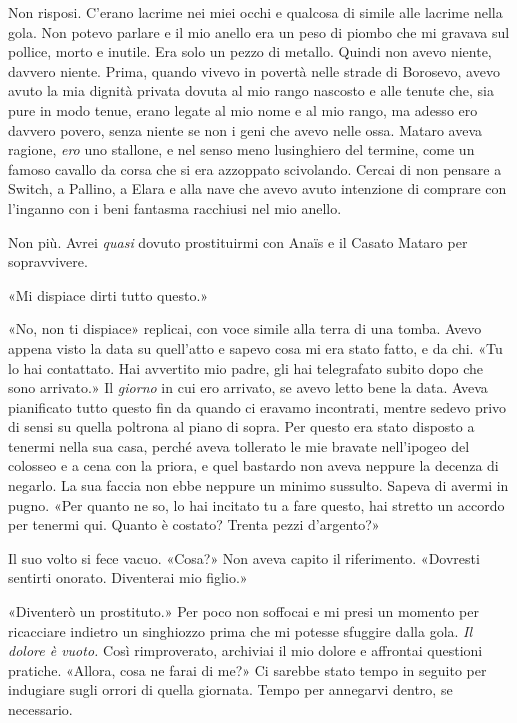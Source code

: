 Non risposi. C'erano lacrime nei miei occhi e qualcosa di simile alle
lacrime nella gola. Non potevo parlare e il mio anello era un peso di
piombo che mi gravava sul pollice, morto e inutile. Era solo un pezzo di
metallo. Quindi non avevo niente, davvero niente. Prima, quando vivevo
in povertà nelle strade di Borosevo, avevo avuto la mia dignità privata
dovuta al mio rango nascosto e alle tenute che, sia pure in modo tenue,
erano legate al mio nome e al mio rango, ma adesso ero davvero povero,
senza niente se non i geni che avevo nelle ossa. Mataro aveva ragione,
\emph{ero} uno stallone, e nel senso meno lusinghiero del termine, come
un famoso cavallo da corsa che si era azzoppato scivolando. Cercai di
non pensare a Switch, a Pallino, a Elara e alla nave che avevo avuto
intenzione di comprare con l'inganno con i beni fantasma racchiusi nel
mio anello.

Non più. Avrei \emph{quasi} dovuto prostituirmi con Anaïs e il Casato
Mataro per sopravvivere.

«Mi dispiace dirti tutto questo.»

«No, non ti dispiace» replicai, con voce simile alla terra di una tomba.
Avevo appena visto la data su quell'atto e sapevo cosa mi era stato
fatto, e da chi. «Tu lo hai contattato. Hai avvertito mio padre, gli hai
telegrafato subito dopo che sono arrivato.» Il \emph{giorno} in cui ero
arrivato, se avevo letto bene la data. Aveva pianificato tutto questo
fin da quando ci eravamo incontrati, mentre sedevo privo di sensi su
quella poltrona al piano di sopra. Per questo era stato disposto a
tenermi nella sua casa, perché aveva tollerato le mie bravate
nell'ipogeo del colosseo e a cena con la priora, e quel bastardo non
aveva neppure la decenza di negarlo. La sua faccia non ebbe neppure un
minimo sussulto. Sapeva di avermi in pugno. «Per quanto ne so, lo hai
incitato tu a fare questo, hai stretto un accordo per tenermi qui.
Quanto è costato? Trenta pezzi d'argento?»

Il suo volto si fece vacuo. «Cosa?» Non aveva capito il riferimento.
«Dovresti sentirti onorato. Diventerai mio figlio.»

«Diventerò un prostituto.» Per poco non soffocai e mi presi un momento
per ricacciare indietro un singhiozzo prima che mi potesse sfuggire
dalla gola. \emph{Il dolore è vuoto.} Così rimproverato, archiviai il
mio dolore e affrontai questioni pratiche. «Allora, cosa ne farai di
me?» Ci sarebbe stato tempo in seguito per indugiare sugli orrori di
quella giornata. Tempo per annegarvi dentro, se necessario.

